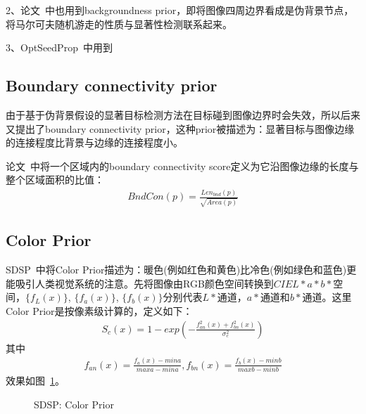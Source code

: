 \documentclass[12pt]{article}
\begin{document}
2、论文~\cite{jiang2013saliency}中也用到backgroundness prior，即将图像四周边界看成是伪背景节点，将马尔可夫随机游走的性质与显著性检测联系起来。

3、OptSeedProp~\cite{lu2014learning}中用到

\subsection{Boundary connectivity prior}

由于基于伪背景假设的显著目标检测方法在目标碰到图像边界时会失效，所以后来又提出了boundary connectivity prior，这种prior被描述为：显著目标与图像边缘的连接程度比背景与边缘的连接程度小。

论文~\cite{zhu2014saliency}中将一个区域内的boundary connectivity score定义为它沿图像边缘的长度与整个区域面积的比值：
\begin{align}
BndCon(p) = \frac{Len_{bnd}(p)}{\sqrt{Area(p)}}
\end{align}

\subsection{Color Prior}

SDSP~\cite{zhang2013sdsp}中将Color Prior描述为：暖色(例如红色和黄色)比冷色(例如绿色和蓝色)更能吸引人类视觉系统的注意。先将图像由RGB颜色空间转换到$CIEL*a*b*$空间，$\{ f_L(x)\}$, $\{ f_a(x)\}$, $\{ f_b(x)\}$分别代表$L*$通道，$a*$通道和$b*$通道。这里Color Prior是按像素级计算的，定义如下：
\begin{align}
S_c(x) = 1-exp\left(-\frac{f_{an}^2(x)+f_{bn}^2(x)}{\sigma_c^2}\right)
\end{align}
其中
\begin{align}
f_{an}(x)=\frac{f_a(x)-mina}{maxa-mina}, f_{bn}(x) = \frac{f_b(x)-minb}{maxb-minb}
\end{align}
效果如图~\ref{fig: SDSPColorPrior}。
\begin{figure}
  \centering 
  \caption{SDSP: Color Prior}
  \label{fig: SDSPColorPrior} %
\end{figure}
\end{document}
